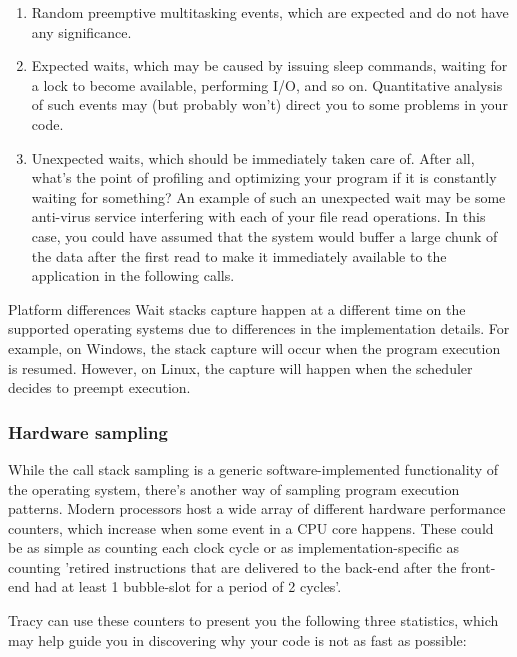 \documentclass[hidelinks,titlepage,a4paper,twoside]{article}
\begin{document}
\begin{enumerate}
\item Random preemptive multitasking events, which are expected and do not have any significance.
\item Expected waits, which may be caused by issuing sleep commands, waiting for a lock to become available, performing I/O, and so on. Quantitative analysis of such events may (but probably won't) direct you to some problems in your code.
\item Unexpected waits, which should be immediately taken care of. After all, what's the point of profiling and optimizing your program if it is constantly waiting for something? An example of such an unexpected wait may be some anti-virus service interfering with each of your file read operations. In this case, you could have assumed that the system would buffer a large chunk of the data after the first read to make it immediately available to the application in the following calls.
\end{enumerate}

\begin{bclogo}[
noborder=true,
couleur=black!5,
logo=\bcattention
]{Platform differences}
Wait stacks capture happen at a different time on the supported operating systems due to differences in the implementation details. For example, on Windows, the stack capture will occur when the program execution is resumed. However, on Linux, the capture will happen when the scheduler decides to preempt execution.
\end{bclogo}

\subsubsection{Hardware sampling}
\label{hardwaresampling}

While the call stack sampling is a generic software-implemented functionality of the operating system, there's another way of sampling program execution patterns. Modern processors host a wide array of different hardware performance counters, which increase when some event in a CPU core happens. These could be as simple as counting each clock cycle or as implementation-specific as counting 'retired instructions that are delivered to the back-end after the front-end had at least 1 bubble-slot for a period of 2 cycles'.

Tracy can use these counters to present you the following three statistics, which may help guide you in discovering why your code is not as fast as possible:
\end{document}
